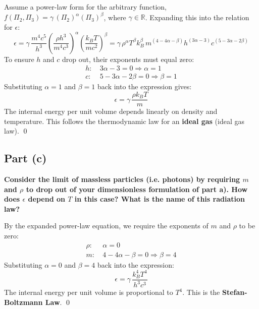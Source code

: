 \documentclass[12pt]{article}
\begin{document}
Assume a power-law form for the arbitrary function, $f(\Pi_2, \Pi_3) = \gamma\, (\Pi_2)^\alpha (\Pi_3)^\beta$, where $\gamma \in \mathbb{R}$. Expanding this into the relation for $\epsilon$:
\begin{equation*}
    \epsilon = \gamma\, \frac{m^4 c^5}{h^3}\left(\frac{\rho h^3}{m^4 c^3}\right)^\alpha \left(\frac{k_B T}{m c^2}\right)^\beta = \gamma\, \rho^\alpha T^\beta k_B^\beta\, m^{(4 - 4\alpha - \beta)} h^{(3\alpha - 3)} c^{(5 - 3\alpha - 2\beta)}
\end{equation*}
To ensure $h$ and $c$ drop out, their exponents must equal zero:
\begin{align*}
    h:&\ 3\alpha - 3 = 0 \Rightarrow \alpha = 1 \\
    c:&\ 5 - 3\alpha - 2\beta = 0 \Rightarrow \beta = 1
\end{align*}
Substituting $\alpha = 1$ and $\beta = 1$ back into the expression gives:
\begin{equation}
    \boxed{
    \epsilon = \gamma\, \frac{\rho k_B T}{m}
    }
\end{equation}
The internal energy per unit volume depends linearly on density and temperature. This follows 
the thermodynamic law for an \textbf{ideal gas} (ideal gas law). \qed

\subsection*{Part (c)}
\textbf{Consider the limit of massless particles (i.e. photons) by requiring $m$ and $\rho$ to drop out of your dimensionless formulation of part a). How does $\epsilon$ depend on $T$ in this case? What is the name of this radiation law?}

By the expanded power-law equation, we require the exponents of $m$ and $\rho$ to be zero:
\begin{align*}
    \rho:&\ \alpha = 0 \\
    m:&\ 4 - 4\alpha - \beta = 0 \Rightarrow \beta = 4
\end{align*}
Substituting $\alpha = 0$ and $\beta = 4$ back into the expression:
\begin{equation}
    \boxed{
    \epsilon = \gamma\, \frac{k_B^4 T^4}{h^3 c^3}
    }
\end{equation}
The internal energy per unit volume is proportional to $T^4$. This is the 
\textbf{Stefan-Boltzmann Law}. \qed

\newpage
\end{document}
